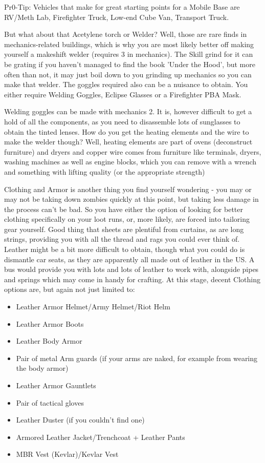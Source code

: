 Pr0-Tip: Vehicles that make for great starting points for a Mobile Base are RV/Meth Lab, Firefighter Truck, Low-end Cube Van, Transport Truck.

But what about that Acetylene torch or Welder? Well, those are rare finds in mechanics-related buildings, which is why you are most likely better off making yourself a makeshift welder (requires 3 in mechanics). The Skill grind for it can be grating if you haven't managed to find the book 'Under the Hood', but more often than not, it may just boil down to you grinding up mechanics so you can make that welder. The goggles required also can be a nuisance to obtain. You either require Welding Goggles, Eclipse Glasses or a Firefighter PBA Mask.

Welding goggles can be made with mechanics 2. It is, however difficult to get a hold of all the components, as you need to disassemble lots of sunglasses to obtain the tinted lenses. How do you get the heating elements and the wire to make the welder though? Well, heating elements are part of ovens (deconstruct furniture) and dryers and copper wire comes from furniture like terminals, dryers, washing machines as well as engine blocks, which you can remove with a wrench and something with lifting quality (or the appropriate strength)

Clothing and Armor is another thing you find yourself wondering - you may or may not be taking down zombies quickly at this point, but taking less damage in the process can't be bad. So you have either the option of looking for better clothing specifically on your loot runs, or, more likely, are forced into tailoring gear yourself. Good thing that sheets are plentiful from curtains, as are long strings, providing you with all the thread and rags you could ever think of. Leather might be a bit more difficult to obtain, though what you could do is dismantle car seats, as they are apparently all made out of leather in the US. A bus would provide you with lots and lots of leather to work with, alongside pipes and springs which may come in handy for crafting. At this stage, decent Clothing options are, but again not just limited to:

\begin{itemize}
\item Leather Armor Helmet/Army Helmet/Riot Helm
\item Leather Armor Boots
\item Leather Body Armor
\item Pair of metal Arm guards (if your arms are naked, for example from wearing the body armor)
\item Leather Armor Gauntlets
\item Pair of tactical gloves
\item Leather Duster (if you couldn't find one)
\item Armored Leather Jacket/Trenchcoat + Leather Pants
\item MBR Vest (Kevlar)/Kevlar Vest
\end{itemize}

